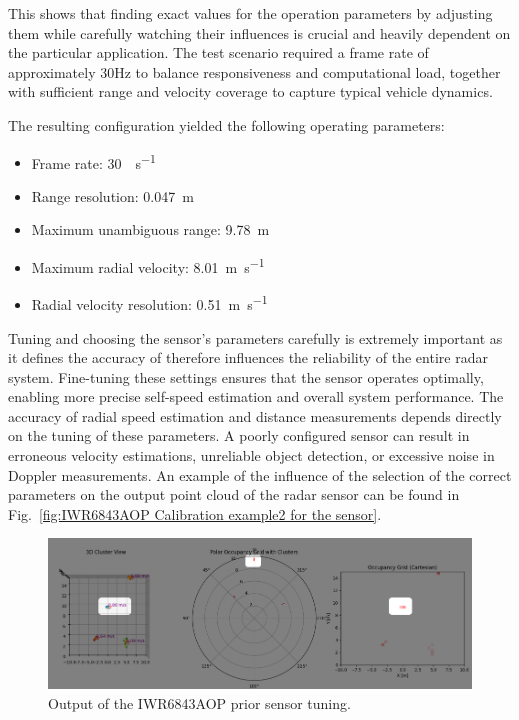 This shows that finding exact values for the operation parameters by adjusting them while carefully watching their influences is crucial and heavily dependent on the particular application.
The test scenario required a frame rate of approximately 30Hz to balance responsiveness and computational load, together with sufficient range and velocity coverage to capture typical vehicle dynamics.

The resulting configuration yielded the following operating parameters:
\begin{itemize}
\item Frame rate: \SI{30}{\frame\per\second}
\item Range resolution: \SI{0.047}{\meter}
\item Maximum unambiguous range: \SI{9.78}{\meter}
\item Maximum radial velocity: \SI{8.01}{\meter\per\second}
\item Radial velocity resolution: \SI{0.51}{\meter\per\second}
\end{itemize}

Tuning and choosing the sensor's parameters carefully is extremely important as it defines the accuracy of 
therefore influences the reliability of the entire radar system.
Fine-tuning these settings ensures that the sensor operates optimally, enabling more precise self-speed estimation and overall system performance.
The accuracy of radial speed estimation and distance measurements depends directly on the tuning of these parameters. A poorly configured sensor can result in erroneous velocity estimations, unreliable object detection, or excessive noise in Doppler measurements. 
An example of the influence of the selection of the correct parameters on the output point cloud of the radar sensor can be found in Fig.~\ref{fig:IWR6843AOP Calibration example2 for the sensor}.

\begin{figure}[!htbp]
    \centering
    \includegraphics[width=1.0\linewidth]{images/calib_ex.png}
    \caption{Output of the IWR6843AOP prior sensor tuning.}
    \label{fig:IWR6843AOP Calibration example for the sensor}
\end{figure}

